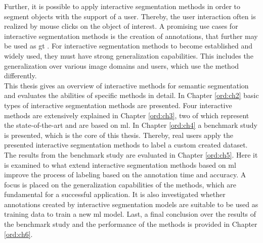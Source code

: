 Further, it is possible to apply interactive segmentation methods in order to segment objects with the support of a user.
Thereby, the user interaction often is realized by mouse clicks on the object of interest.
A promising use cases for interactive segmentation methods is the creation of annotations, that further may be used as \gls{gt} \cite{Man18-DEXTR}.
For interactive segmentation methods to become established and widely used, they must have strong generalization capabilities.
This includes the generalization over various image domains and users, which use the method differently.
\\
\newline
This thesis gives an overview of interactive methods for semantic segmentation and evaluates the abilities of specific methods in detail.
In Chapter \ref{ord:ch2} basic types of interactive segmentation methods are presented.
Four interactive methods are extensively explained in Chapter \ref{ord:ch3}, two of which represent the state-of-the-art and are based on \gls{ml}.
In Chapter \ref{ord:ch4} a benchmark study is presented, which is the core of this thesis.
Thereby, real users apply the presented interactive segmentation methods to label a custom created dataset.
The results from the benchmark study are evaluated in Chapter \ref{ord:ch5}.
Here it is examined to what extend interactive segmentation methods based on \gls{ml} improve the process of labeling based on the annotation time and accuracy.
A focus is placed on the generalization capabilities of the methods, which are fundamental for a successful application.
It is also investigated whether annotations created by interactive segmentation models are suitable to be used as training data to train a new \gls{ml} model.
Last, a final conclusion over the results of the benchmark study and the performance of the methods is provided in Chapter \ref{ord:ch6}.

